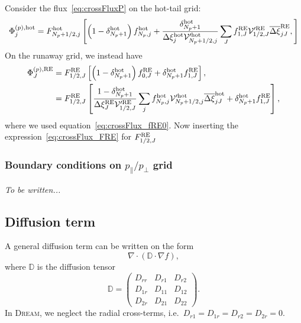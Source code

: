 \documentclass{notes}
\newcommand{\DREAM}{\textsc{Dream}}
\newcommand{\Vp}{\mathcal{V}'}
\begin{document}
    Consider the flux~\eqref{eq:crossFluxP} on the hot-tail grid:
    \begin{equation}
        \Phi^{(p),{\rm hot}}_j = F^{\rm hot}_{N_p+1/2,j} \left[
            \left( 1-\delta^{\rm hot}_{N_p+1}\right)f^{\rm hot}_{N_p,j} +
            \frac{\delta^{\rm hot}_{N_p+1}}{\Delta\xi^{\rm hot}_j\Vp^{\rm hot}_{N_p+1/2,j}} \sum_J
                f_{1,J}^{\rm RE} \Vp^{\rm RE}_{1/2,J} \overline{\Delta\xi}_{jJ}^{\rm RE},
        \right]
    \end{equation}
    On the runaway grid, we instead have
    \begin{equation}
        \begin{aligned}
            \Phi^{(p),{\rm RE}}_J &= F^{\rm RE}_{1/2,J} \left[
                \left( 1-\delta^{\rm hot}_{N_p+1} \right)f^{\rm RE}_{0,J} +
                \delta^{\rm hot}_{N_p+1} f^{\rm RE}_{1,J}
            \right],\\
            &= F^{\rm RE}_{1/2,J} \left[
                \frac{1-\delta^{\rm hot}_{N_p+1}}{\Delta\xi^{\rm RE}_J\Vp^{\rm RE}_{1/2,J}} \sum_j
                    f_{N_p,j}^{\rm hot} \Vp^{\rm hot}_{N_p+1/2,j} \overline{\Delta\xi}_{jJ}^{\rm hot} +
                \delta^{\rm hot}_{N_p+1} f^{\rm RE}_{1,J}
            \right],
        \end{aligned}
    \end{equation}
    where we used equation~\eqref{eq:crossFlux_fRE0}. Now inserting the
    expression~\eqref{eq:crossFlux_FRE} for $F_{1/2,J}^{\rm RE}$

    \subsubsection{Boundary conditions on $p_\parallel / p_\perp$ grid}
    \emph{To be written...}

    \subsection{Diffusion term}\label{sec:diffusion}
    A general diffusion term can be written on the form
    \begin{equation*}
        \nabla\cdot\left( \mathbb{D}\cdot\nabla f \right),
    \end{equation*}
    where $\mathbb{D}$ is the diffusion tensor
    \begin{equation*}
        \mathbb{D} = \begin{pmatrix}
            D_{rr} & D_{r1} & D_{r2} \\
            D_{1r} & D_{11} & D_{12} \\
            D_{2r} & D_{21} & D_{22}
        \end{pmatrix}.
    \end{equation*}
    In \DREAM, we neglect the radial cross-terms, i.e.\
    $D_{r1} = D_{1r} = D_{r2} = D_{2r} = 0$.
\end{document}
